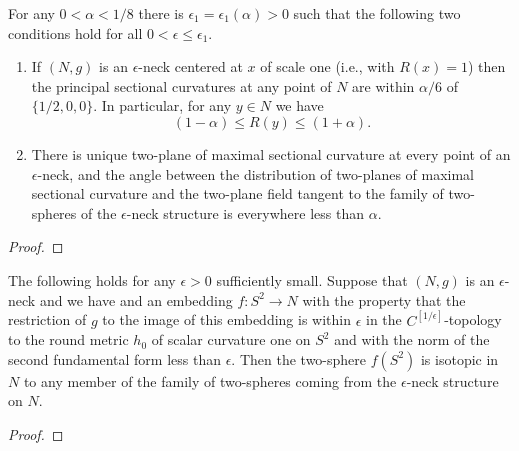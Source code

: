 \begin{lemma}
\label{lem:epsilon-neck-curvature-pinching}
\label{neckcurv}
For any $0<\alpha<1/8$  there is $\epsilon_1=\epsilon_1(\alpha)>0$ such that
the following two conditions hold for all $0<\epsilon\le \epsilon_1$.
\begin{enumerate} \item[(1)] If $(N,g)$ is an $\epsilon$-neck centered at $x$ of
scale one (i.e., with $R(x)=1$) then the principal sectional
curvatures at any point of $N$ are within $\alpha/6$ of
$\{1/2,0,0\}$. In particular, for any $y\in N$ we have
$$(1-\alpha)\le R(y)\le (1+\alpha).$$
\item[(2)] There is unique two-plane of maximal sectional curvature at
every point of an $\epsilon$-neck, and the angle between the
distribution of two-planes of maximal sectional curvature and the
two-plane field tangent to the family of two-spheres of the
$\epsilon$-neck structure is everywhere less than $\alpha$.
\end{enumerate}
\end{lemma}

\begin{proof}
\sketch
\end{proof}


\begin{corollary}
\label{cor:embedded-sphere-isotopic-to-neck-fiber}
\label{s2isotopic}
The following holds for any $\epsilon>0$ sufficiently small. Suppose
that $(N,g)$ is an $\epsilon$-neck and we have  and an embedding
$f\colon S^2 \to N$ with the property that the restriction of $g$ to
the image of this embedding is within $\epsilon$ in the
$C^{[1/\epsilon]}$-topology to the round metric $h_0$ of scalar
curvature one on $S^2$ and with the norm of the second fundamental
form less than $\epsilon$. Then the two-sphere $f(S^2)$ is isotopic
in $N$ to any member of the family of two-spheres coming from the
$\epsilon$-neck structure on $N$.
\end{corollary}



\begin{proof}
\sketch
{}
\end{proof}



